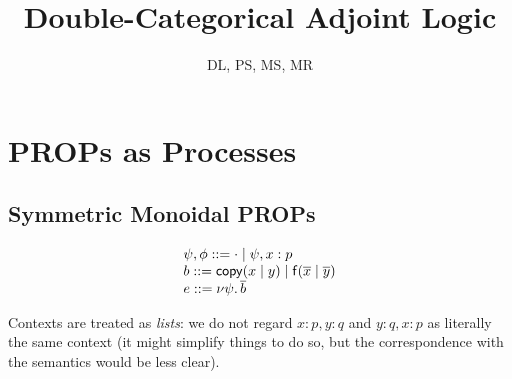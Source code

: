 \documentclass{article}
\begin{document}
\title{Double-Categorical Adjoint Logic}
\author{DL, PS, MS, MR}




\maketitle

\section{PROPs as Processes}

\subsection{Symmetric Monoidal PROPs}

\newcommand\const[3]{\ensuremath{\dsd{#1}(#2 \mid #3)}}
\newcommand\cpy[2]{\ensuremath{\dsd{copy}(#1 \mid #2)}}
\newcommand\cut[2]{\ensuremath{\nu #1. \, #2}}
\newcommand\lst[1]{\ensuremath{\overline{#1}}}
\newcommand\bfunc[2]{\ensuremath{#1 \bullet #2}}
\newcommand\idp[1]{\ensuremath{1_{#1}}}

\[
\begin{array}{l}
\psi,\phi ::= \cdot \mid \psi, x:p\\
b ::= \cpy{x}{y} \mid \const{f}{\lst{x}}{\lst{y}}\\
e ::= \cut{\psi}{\lst{b}}
\end{array}
\]

Contexts are treated as \emph{lists}: we do not regard $x:p,y:q$ and
$y:q,x:p$ as literally the same context (it might simplify things to do
so, but the correspondence with the semantics would be less clear).  
\end{document}
